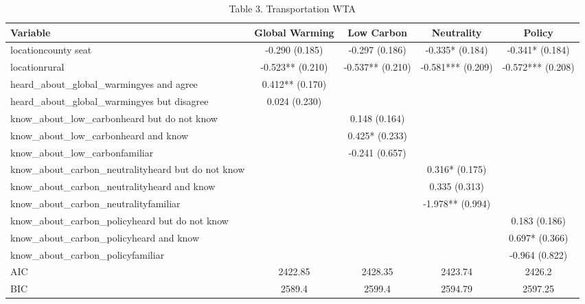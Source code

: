 \begin{table}[!htbp]
\centering
\caption{Table 3. Transportation WTA}
\begin{tabular}{lcccc}
\hline
Variable & Global Warming & Low Carbon & Neutrality & Policy \\
\hline
locationcounty seat & -0.290 (0.185) & -0.297 (0.186) & -0.335* (0.184) & -0.341* (0.184) \\
locationrural & -0.523** (0.210) & -0.537** (0.210) & -0.581*** (0.209) & -0.572*** (0.208) \\
heard\_about\_global\_warmingyes and agree & 0.412** (0.170) &  &  &  \\
heard\_about\_global\_warmingyes but disagree & 0.024 (0.230) &  &  &  \\
know\_about\_low\_carbonheard but do not know &  & 0.148 (0.164) &  &  \\
know\_about\_low\_carbonheard and know &  & 0.425* (0.233) &  &  \\
know\_about\_low\_carbonfamiliar &  & -0.241 (0.657) &  &  \\
know\_about\_carbon\_neutralityheard but do not know &  &  & 0.316* (0.175) &  \\
know\_about\_carbon\_neutralityheard and know &  &  & 0.335 (0.313) &  \\
know\_about\_carbon\_neutralityfamiliar &  &  & -1.978** (0.994) &  \\
know\_about\_carbon\_policyheard but do not know &  &  &  & 0.183 (0.186) \\
know\_about\_carbon\_policyheard and know &  &  &  & 0.697* (0.366) \\
know\_about\_carbon\_policyfamiliar &  &  &  & -0.964 (0.822) \\
AIC & 2422.85 & 2428.35 & 2423.74 & 2426.2 \\
BIC & 2589.4 & 2599.4 & 2594.79 & 2597.25 \\
\hline
\end{tabular}
\end{table}
